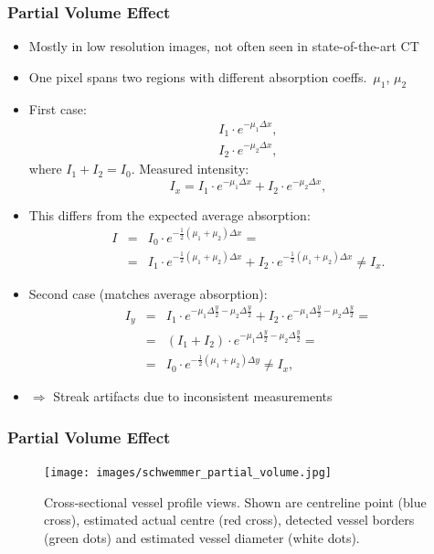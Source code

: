 \begin{frame}[allowframebreaks]
	\frametitle{Partial Volume Effect}
	\hspace{-0.3cm}

	\begin{itemize}
		\item Mostly in low resolution images, not often seen in state-of-the-art CT
		\item One pixel spans two regions with different absorption coeffs.~$\mu_1$, $\mu_2$
		\item First case:
		      \begin{eqnarray}
			      I_1 \cdot e^{-\mu_1\Delta x},\\
			      I_2 \cdot e^{-\mu_2\Delta x},
		      \end{eqnarray}
		      where $I_1 + I_2 = I_0$. Measured intensity:
		      \begin{equation}
			      \label{eq:ct_partial1}
			      I_x = I_1 \cdot e^{-\mu_1\Delta x} + I_2 \cdot e^{-\mu_2 \Delta x},
		      \end{equation}

		\item This differs from the expected average absorption:
		      \begin{eqnarray}
			      I &=& I_0 \cdot e^{- \frac{1}{2}(\mu_1 + \mu_2) \Delta x} =\\
			      &=& I_1 \cdot e^{- \frac{1}{2}(\mu_1 + \mu_2) \Delta x} + I_2 \cdot e^{- \frac{1}{2}(\mu_1 + \mu_2) \Delta x} \neq I_x.
		      \end{eqnarray}

		\item Second case (matches average absorption):
		      \begin{eqnarray}
			      I_y &=& I_1 \cdot e^{-\mu_1\Delta\frac{y}{2} - \mu_2\Delta\frac{y}{2}} +I_2 \cdot e^{-\mu_1\Delta\frac{y}{2} - \mu_2\Delta\frac{y}{2}} = \\
			      &=& (I_1 + I_2) \cdot e^{-\mu_1\Delta\frac{y}{2} - \mu_2\Delta\frac{y}{2}} =\\
			      &=& I_0 \cdot e^{-\frac{1}{2}(\mu_1 + \mu_2)\Delta y} \neq I_x,
		      \end{eqnarray}
		\item[ ] $\Rightarrow$ Streak artifacts due to inconsistent measurements

	\end{itemize}

\end{frame}
\begin{frame}
	\frametitle{Partial Volume Effect}

	\begin{figure}[tbp]
		\centering
		\texttt{[image: images/schwemmer\_partial\_volume.jpg]}
		\caption{Cross-sectional vessel profile views. Shown are centreline point (blue cross), estimated actual centre (red cross), detected vessel borders (green dots) and estimated vessel diameter (white dots).}%
		\label{fig:ct_partial_1}
	\end{figure}
	\vspace{-0.5cm}

	\flushright{}
	\tiny

\end{frame}

